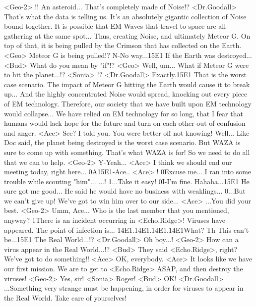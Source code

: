 <Geo-2> !! 
An asteroid... 
That's completely made of Noise!? 
<Dr.Goodall> That's what the data is telling us. 
It's an absolutely gigantic collection of Noise bound together. 
It is possible that EM Waves that travel to space are all gathering at the same spot... 
Thus, creating Noise, and ultimately Meteor G. 
On top of that, it is being pulled by the Crimson that has collected on the Earth. 
<Geo> Meteor G is being pulled!? 
N-No way...{15}{E1} If the Earth was destroyed... 
<Bud> What do you mean by "if"!? 
<Geo> Well, um... 
What if Meteor G were to hit the planet...!? 
<Sonia> !? 
<Dr.Goodall> Exactly.{15}{E1} That is the worst case scenario. 
The impact of Meteor G hitting the Earth would cause it to break up... 
And the highly concentrated Noise would spread, knocking 
out every piece of EM technology. 
Therefore, our society that we have built upon EM technology would collapse... 
We have relied on EM technology for so long, that I fear that humans would 
lack hope for the future and turn on each other out of confusion and anger. 
<Ace> See? I told you. 
You were better off not knowing! 
Well... 
Like Doc said, the planet being destroyed is the worst case scenario. 
But WAZA is sure to come up with something. 
That's what WAZA is for! 
So we need to do all that we can to help. 
<Geo-2> Y-Yeah... 
<Ace> I think we should end our meeting today, right here... 
0A{15}{E1}-Ace.. 
<Ace> ! 
0Excuse me... 
I ran into some trouble while scouting "him"... 
...! 
1...Take it easy! 
0I-I'm fine. 
Hahaha...{15}{E1} He sure got me good... 
He said he would have no business with weaklings... 
0...But we can't give up! 
We've got to win him over to our side... 
<Ace> ...You did your best. 
<Geo-2> Umm, Ace... 
Who is the last member that you mentioned, anyway? 
1There is an incident occurring in <Echo.Ridge>! 
Viruses have appeared. The point of infection is... 
{14}{E1}.{14}{E1}.{14}{E1}.{14}{E1}What? 
Th-This can't be...{15}{E1} The Real World...!? 
<Dr.Goodall> Oh boy...! 
<Geo-2> How can a virus appear in the Real World...!? 
<Bud> They said <Echo.Ridge>, right? 
We've got to do something!! 
<Ace> OK, everybody. 
<Ace> It looks like we have our first mission. 
We are to get to <Echo.Ridge> ASAP, and then destroy the viruses! 
<Geo-2> Yes, sir! 
<Sonia> Roger! 
<Bud> OK! 
<Dr.Goodall> ...Something very strange must be happening, in order 
for viruses to appear in the Real World. 
Take care of yourselves! 
